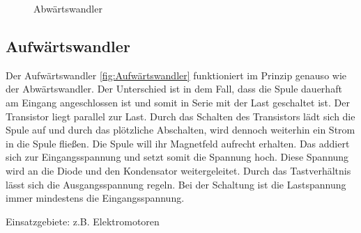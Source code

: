 \begin{figure}[htbp]
{
	}
	\caption{Abwärtswandler}
	\label{fig:Abwärtswandler}
\end{figure}

\subsection{Aufwärtswandler }

Der Aufwärtswandler \ref{fig:Aufwärtswandler} funktioniert im Prinzip genauso wie der Abwärtswandler. Der Unterschied ist in dem Fall, dass die Spule dauerhaft am Eingang angeschlossen ist und somit in Serie mit der Last geschaltet ist. Der Transistor liegt parallel zur Last. Durch das Schalten des Transistors lädt sich die Spule auf und durch das plötzliche Abschalten, wird dennoch weiterhin ein Strom in die Spule fließen. Die Spule will ihr Magnetfeld aufrecht erhalten. Das addiert sich zur Eingangsspannung und setzt somit die Spannung hoch. Diese Spannung wird an die Diode und den Kondensator weitergeleitet. Durch das Tastverhältnis lässt sich die Ausgangsspannung regeln. Bei der Schaltung ist die Lastspannung immer mindestens die Eingangsspannung. 

\bigskip

Einsatzgebiete: z.B. Elektromotoren  

\bigskip

